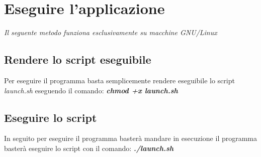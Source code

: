 \documentclass{article}
\begin{document}
\newpage
\section{Eseguire l'applicazione}
\emph{Il seguente metodo funziona esclusivamente su macchine GNU/Linux}

\subsection{Rendere lo script eseguibile}
Per eseguire il programma basta semplicemente rendere eseguibile lo script \emph{launch.sh}
eseguendo il comando: \textbf{\emph{chmod +x launch.sh}}

\subsection{Eseguire lo script}
In seguito per eseguire il programma basterà mandare in esecuzione il programma 
basterà eseguire lo script con il comando: \textbf{\emph{./launch.sh}}
\end{document}
